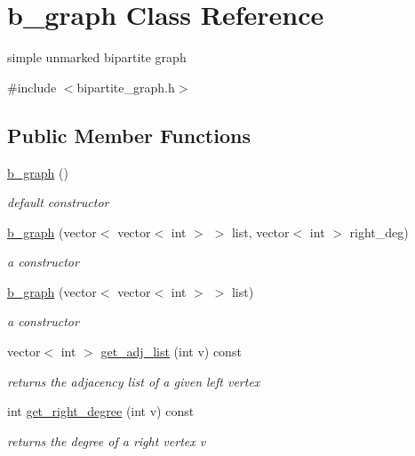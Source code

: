 \hypertarget{classb__graph}{}\section{b\+\_\+graph Class Reference}
\label{classb__graph}


simple unmarked bipartite graph  




{\ttfamily \#include $<$bipartite\+\_\+graph.\+h$>$}

\subsection*{Public Member Functions}
\begin{DoxyCompactItemize}
\item 
\hyperlink{classb__graph_a83ebab7ff22a3cf19c0cf62de3f8b306}{b\+\_\+graph} ()
\begin{DoxyCompactList}\small\item\em default constructor \end{DoxyCompactList}\item 
\hyperlink{classb__graph_a6032fbf9681d275260dd9a8587447e61}{b\+\_\+graph} (vector$<$ vector$<$ int $>$ $>$ list, vector$<$ int $>$ right\+\_\+deg)
\begin{DoxyCompactList}\small\item\em a constructor \end{DoxyCompactList}\item 
\hyperlink{classb__graph_af94e3bc6694a312f13c9305ec5ffe4ee}{b\+\_\+graph} (vector$<$ vector$<$ int $>$ $>$ list)
\begin{DoxyCompactList}\small\item\em a constructor \end{DoxyCompactList}\item 
vector$<$ int $>$ \hyperlink{classb__graph_aa81c7179b9c6cb4986c4b41e84a85799}{get\+\_\+adj\+\_\+list} (int v) const
\begin{DoxyCompactList}\small\item\em returns the adjacency list of a given left vertex \end{DoxyCompactList}\item 
int \hyperlink{classb__graph_a1caf2e1ca8ee19e7407f489be6b171b8}{get\+\_\+right\+\_\+degree} (int v) const
\begin{DoxyCompactList}\small\item\em returns the degree of a right vertex v \end{DoxyCompactList}\item 

\end{DoxyCompactItemize}
